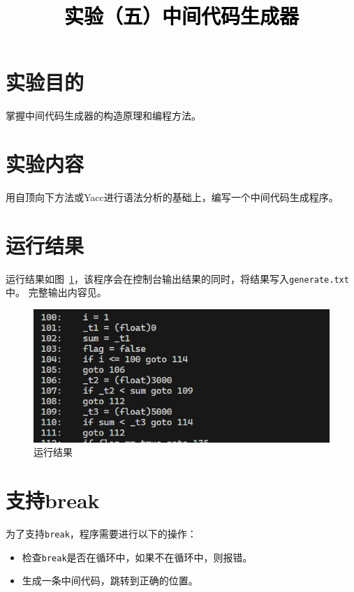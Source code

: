 \documentclass[a4paper,twoside]{article}
\newcommand{\PaperTitle}{实验（五）中间代码生成器}  %
\begin{document}
\newpage

\title{
	\Large{\textcolor{black}{\PaperTitle}}
}
	
	
\maketitle
	
\tableofcontents
 
\newpage
\setcounter{page}{1}

\begin{spacing}{1.2}

\section{实验目的}

掌握中间代码生成器的构造原理和编程方法。

\section{实验内容}

用自顶向下方法或Yacc进行语法分析的基础上，编写一个中间代码生成程序。

\section{运行结果}

运行结果如图~\ref{fig:output}，该程序会在控制台输出结果的同时，将结果写入\texttt{generate.txt}中。
完整输出内容见。
\begin{figure}[htb]
	\centering
	\includegraphics[width=0.6\linewidth]{output.png}
	\caption{运行结果}
	\label{fig:output}
\end{figure}


\section{支持break}

为了支持\texttt{break}，程序需要进行以下的操作：
\begin{itemize}
	\item 检查\texttt{break}是否在循环中，如果不在循环中，则报错。
	\item 生成一条中间代码，跳转到正确的位置。
\end{itemize}


\end{spacing}
\end{document}
